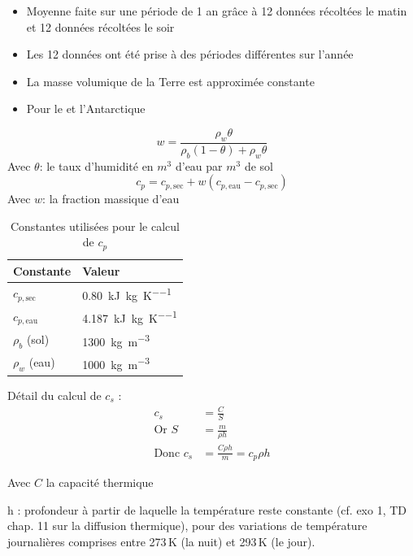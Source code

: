 \documentclass[a4paper,12pt]{article}
\begin{document}
\begin{itemize}
    \item Moyenne faite sur une période de 1 an grâce à 12 données récoltées le matin et 12 données récoltées le soir 
    \item Les 12 données ont été prise à des périodes différentes sur l'année 
    \item La masse volumique de la Terre est approximée constante 
    \item Pour le  et l’Antarctique  
\end{itemize}
\[
w = \frac{\rho_w \theta}{\rho_b (1 - \theta) + \rho_w \theta}
\]
Avec \(\theta\): le taux d'humidité en \(m^3\) d'eau par \(m^3\) de sol 
\[
c_p = c_{p,\text{sec}} + w (c_{p,\text{eau}} - c_{p,\text{sec}})
\]
Avec \(w\): la fraction massique d'eau 
\begin{table}[h!]
\centering
\begin{tabular}{ll}
\textbf{Constante} & \textbf{Valeur} \\
\hline
$c_{p,\text{sec}}$ & \SI{0.80}{\kilo\joule\per\kilogram\per\kelvin} \\
$c_{p,\text{eau}}$ & \SI{4.187}{\kilo\joule\per\kilogram\per\kelvin} \\
$\rho_b$ (sol) & \SI{1300}{\kilogram\per\cubic\metre} \\
$\rho_w$ (eau) & \SI{1000}{\kilogram\per\cubic\metre} \\
\end{tabular}
\caption*{Constantes utilisées pour le calcul de $c_p$}
\vspace{1cm}
\end{table}

Détail du calcul de \( c_s \) :\\
\begin{align*}
c_s &= \frac{C}{S} \\
\text{Or } S &= \frac{m}{\rho h} \\
\text{Donc } c_s &= \frac{C \rho h}{m} = c_p  \rho  h
\end{align*}

\hspace*{2cm}Avec \( C \) la capacité thermique

\vspace{1cm} %

h : profondeur à partir de laquelle la température reste constante (cf. exo 1, TD chap. 11 sur la diffusion thermique), pour des variations de température journalières comprises entre 273\,K (la nuit) et 293\,K (le jour).\\
\end{document}
